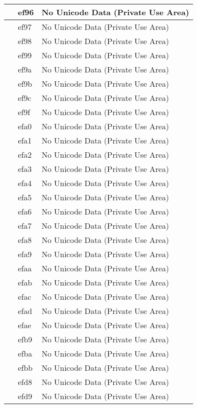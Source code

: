 \documentclass[12pt,letterpaper,openany]{book}
\begin{document}
\begin{center}
\begin{supertabular}{|m{0.25in}|m{0.5in}|m{4in}|}
 & ef96 & No Unicode Data (Private Use Area)\\\hline
 & ef97 & No Unicode Data (Private Use Area)\\\hline
 & ef98 & No Unicode Data (Private Use Area)\\\hline
 & ef99 & No Unicode Data (Private Use Area)\\\hline
 & ef9a & No Unicode Data (Private Use Area)\\\hline
 & ef9b & No Unicode Data (Private Use Area)\\\hline
 & ef9c & No Unicode Data (Private Use Area)\\\hline
 & ef9f & No Unicode Data (Private Use Area)\\\hline
 & efa0 & No Unicode Data (Private Use Area)\\\hline
 & efa1 & No Unicode Data (Private Use Area)\\\hline
 & efa2 & No Unicode Data (Private Use Area)\\\hline
 & efa3 & No Unicode Data (Private Use Area)\\\hline
 & efa4 & No Unicode Data (Private Use Area)\\\hline
 & efa5 & No Unicode Data (Private Use Area)\\\hline
 & efa6 & No Unicode Data (Private Use Area)\\\hline
 & efa7 & No Unicode Data (Private Use Area)\\\hline
 & efa8 & No Unicode Data (Private Use Area)\\\hline
 & efa9 & No Unicode Data (Private Use Area)\\\hline
 & efaa & No Unicode Data (Private Use Area)\\\hline
 & efab & No Unicode Data (Private Use Area)\\\hline
 & efac & No Unicode Data (Private Use Area)\\\hline
 & efad & No Unicode Data (Private Use Area)\\\hline
 & efae & No Unicode Data (Private Use Area)\\\hline
 & efb9 & No Unicode Data (Private Use Area)\\\hline
 & efba & No Unicode Data (Private Use Area)\\\hline
 & efbb & No Unicode Data (Private Use Area)\\\hline
 & efd8 & No Unicode Data (Private Use Area)\\\hline
 & efd9 & No Unicode Data (Private Use Area)\\\hline

\end{supertabular}
\end{center}
\end{document}
